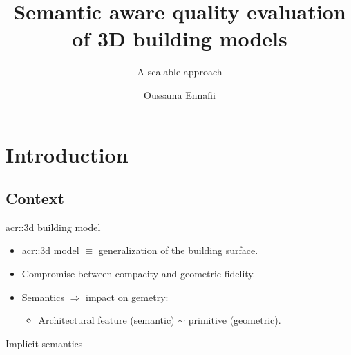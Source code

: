 \documentclass[10pt]{beamer}
\title{Semantic aware quality evaluation of 3D building models}
\subtitle{A scalable approach}
\date{\tiny \DTMdisplaydate{2020}{1}{10}{5}}
\author{
    Oussama Ennafii
}
\begin{document}
    \begin{frame}[plain]
        \titlepage
    \end{frame}

    \section{Introduction}
        \subsection{Context}
            \begin{frame}{\texorpdfstring{\acrshort*{acr::3d}}{3D} building model}
                \begin{itemize}[label=$\blacktriangleright$, font=\color{IGNGreen}]
                    \item<1-> \Acrfull{acr::3d} model \(\equiv\) generalization of the building surface.
                    \item<2-> Compromise between compacity and geometric fidelity.
                    \item<3-> Semantics \(\Rightarrow\) impact on gemetry:
                        \begin{itemize}
                            \item<4-> Architectural feature (semantic) \(\sim\) primitive (geometric).
                        \end{itemize}
                \end{itemize}
            \end{frame}

            \begin{frame}{Implicit semantics}
                \begin{figure}[H]
                    \centering
                    \caption{
                        \scriptsize 
                    }
                \end{figure}
            \end{frame}
\end{document}

